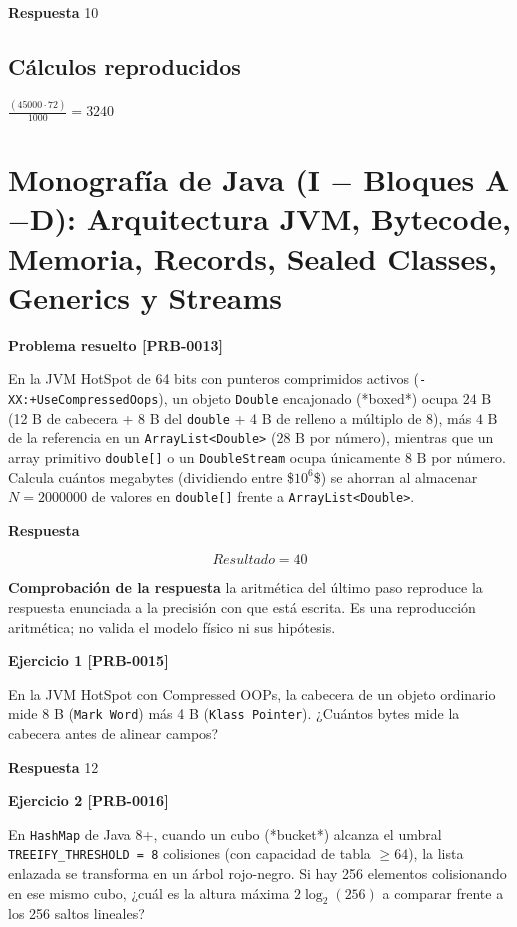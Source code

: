\documentclass{book}
\begin{document}
\noindent\textbf{Respuesta} 10

\subsection*{Cálculos reproducidos}

\(\frac{\left(45000\cdot 72\right)}{1000} = 3240\)

\section{Monografía de Java (I \(-\) Bloques A\(-\)D): Arquitectura JVM, Bytecode, Memoria, Records, Sealed Classes, Generics y Streams}

\noindent\textbf{Problema resuelto [PRB-0013]}

En la JVM HotSpot de 64 bits con punteros comprimidos activos (\texttt{-XX:+UseCompressedOops}), un objeto \texttt{Double} encajonado (*boxed*) ocupa \(24\text{ B}\) (12 B de cabecera + 8 B del \texttt{double} + 4 B de relleno a múltiplo de 8), más \(4\text{ B}\) de la referencia en un \texttt{ArrayList<Double>} (\(28\text{ B}\) por número), mientras que un array primitivo \texttt{double[]} o un \texttt{DoubleStream} ocupa únicamente \(8\text{ B}\) por número. Calcula cuántos megabytes (dividiendo entre \$\(10^6\)\$) se ahorran al almacenar \(N = 2000000\) de valores en \texttt{double[]} frente a \texttt{ArrayList<Double>}.

\noindent\textbf{Respuesta}

\[
Resultado = 40
\]

\noindent\textbf{Comprobación de la respuesta} la aritmética del último paso reproduce la respuesta enunciada a la precisión con que está escrita. Es una reproducción aritmética; no valida el modelo físico ni sus hipótesis.

\noindent\textbf{Ejercicio 1 [PRB-0015]}

En la JVM HotSpot con Compressed OOPs, la cabecera de un objeto ordinario mide 8 B (\texttt{Mark Word}) más 4 B (\texttt{Klass Pointer}). ¿Cuántos bytes mide la cabecera antes de alinear campos?

\noindent\textbf{Respuesta} 12

\noindent\textbf{Ejercicio 2 [PRB-0016]}

En \texttt{HashMap} de Java 8+, cuando un cubo (*bucket*) alcanza el umbral \texttt{TREEIFY\_THRESHOLD = 8} colisiones (con capacidad de tabla \(\ge 64\)), la lista enlazada se transforma en un árbol rojo-negro. Si hay 256 elementos colisionando en ese mismo cubo, ¿cuál es la altura máxima \(2 \log_2(256)\) a comparar frente a los 256 saltos lineales?
\end{document}
